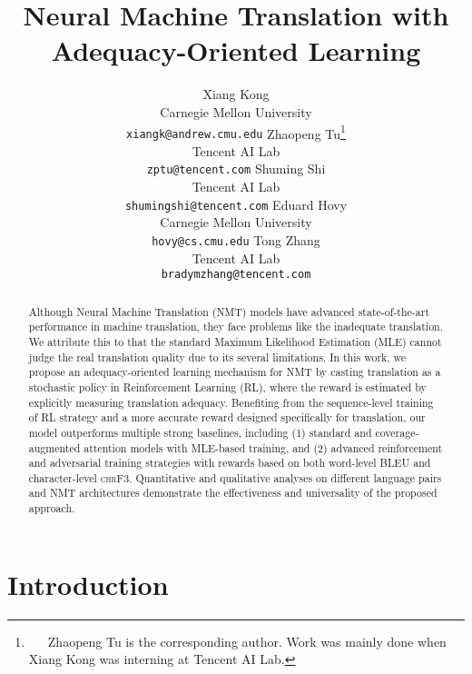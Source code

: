 \documentclass[letterpaper]{article} \usepackage{aaai19}  \usepackage{times}  \usepackage{helvet}  \usepackage{courier}  \usepackage{url}  \usepackage{graphicx}  \frenchspacing  \setlength{\pdfpagewidth}{8.5in}  \setlength{\pdfpageheight}{11in}  \usepackage{amsmath}
\begin{document}
\title{Neural Machine Translation with Adequacy-Oriented Learning}
\author{Xiang Kong \\ Carnegie Mellon University \\ {\tt xiangk@andrew.cmu.edu} \And
       Zhaopeng Tu\thanks{~~~Zhaopeng Tu is the corresponding author. Work was mainly done when Xiang Kong was interning at Tencent AI Lab.} \\ Tencent AI Lab \\ {\tt zptu@tencent.com} \AND
       Shuming Shi \\ Tencent AI Lab \\ {\tt shumingshi@tencent.com} \And
       Eduard Hovy \\ Carnegie Mellon University \\ {\tt hovy@cs.cmu.edu} \And
       Tong Zhang \\ Tencent AI Lab \\ {\tt bradymzhang@tencent.com}}


\maketitle
\begin{abstract}
Although Neural Machine Translation (NMT) models have advanced state-of-the-art performance in machine translation, they face problems like the inadequate translation. 
We attribute this to that the standard Maximum Likelihood Estimation (MLE) cannot judge the real translation quality due to its several limitations. 
In this work, we propose an adequacy-oriented learning mechanism for NMT by casting translation as a stochastic policy in Reinforcement Learning (RL), where the reward is estimated by explicitly measuring translation adequacy.
Benefiting from the sequence-level training of RL strategy and a more accurate reward designed specifically for translation, our model outperforms multiple strong baselines, including (1) standard and coverage-augmented attention models with MLE-based training, and (2) advanced reinforcement and adversarial training strategies with rewards based on both word-level BLEU and character-level \textsc{chrF3}.
Quantitative and qualitative analyses on different language pairs and NMT architectures demonstrate the effectiveness and universality of the proposed approach.

\end{abstract}

\section{Introduction}
\end{document}
